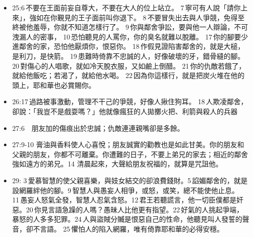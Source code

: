 \begin{itemize}
\item 25:6 不要在王面前妄自尊大，不要在大人的位上站立。 7 寧可有人說「請你上來」，強如在你覲見的王子面前叫你退下。 8 不要冒失出去與人爭競，免得至終被他羞辱，你就不知道怎樣行了。 9 你與鄰舍爭訟，要與他一人辯論，不可洩漏人的密事， 10 恐怕聽見的人罵你，你的臭名就難以脫離。 17 你的腳要少進鄰舍的家，恐怕他厭煩你，恨惡你。 18 作假見證陷害鄰舍的，就是大槌，是利刀，是快箭。 19 患難時倚靠不忠誠的人，好像破壞的牙，錯骨縫的腳。 20 對傷心的人唱歌，就如冷天脫衣服，又如鹼上倒醋。 21 你的仇敵若餓了，就給他飯吃；若渴了，就給他水喝。 22 因為你這樣行，就是把炭火堆在他的頭上，耶和華也必賞賜你。
\item 26:17 過路被事激動，管理不干己的爭競，好像人揪住狗耳。 18 人欺凌鄰舍，卻說：「我豈不是戲耍嗎？」他就像瘋狂的人拋擲火把、利箭與殺人的兵器
\item 27:6　朋友加的傷痕出於忠誠；仇敵連連親嘴卻是多餘。
\item 27:9-10 膏油與香料使人心喜悅；朋友誠實的勸教也是如此甘美。你的朋友和父親的朋友，你都不可離棄。你遭難的日子，不要上弟兄的家去；相近的鄰舍強如遠方的弟兄。14 清晨起來，大聲給朋友祝福的，就算是咒詛他。
\item 29: 3 愛慕智慧的使父親喜樂，與妓女結交的卻浪費錢財。5 諂媚鄰舍的，就是設網羅絆他的腳。9 智慧人與愚妄人相爭，或怒，或笑，總不能使他止息。11 愚妄人怒氣全發，智慧人忍氣含怒。12 君王若聽謊言，他一切臣僕都是奸惡。20 你見言語急躁的人嗎？愚昧人比他更有指望。22 好氣的人挑起爭端，暴怒的人多多犯罪。24 人與盜賊分贓是恨惡自己的性命，他聽見叫人發誓的聲音，卻不言語。 25 懼怕人的陷入網羅，唯有倚靠耶和華的必得安穩。
\end{itemize}

